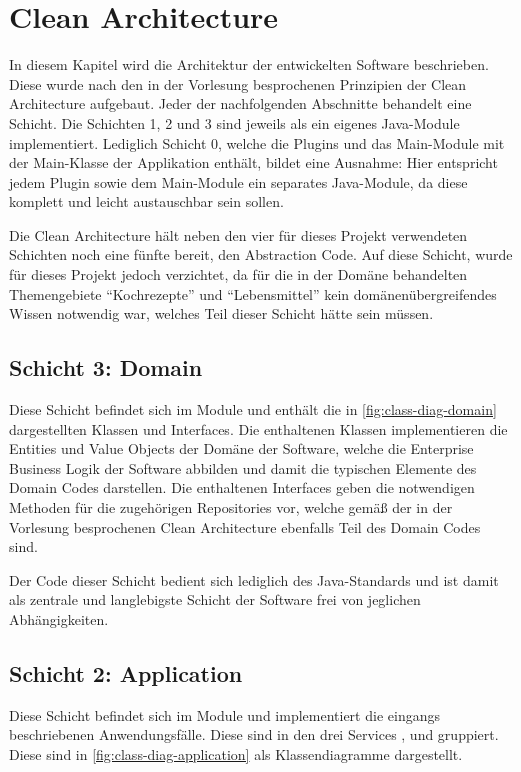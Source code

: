 \chapter{Clean Architecture}
In diesem Kapitel wird die Architektur der entwickelten Software beschrieben. Diese wurde nach den in der Vorlesung besprochenen Prinzipien der Clean Architecture aufgebaut. Jeder der nachfolgenden Abschnitte behandelt eine Schicht. Die Schichten 1, 2 und 3 sind jeweils als ein eigenes Java-Module implementiert. Lediglich Schicht 0, welche die Plugins und das Main-Module mit der Main-Klasse der Applikation enthält, bildet eine Ausnahme: Hier entspricht jedem Plugin sowie dem Main-Module ein separates Java-Module, da diese komplett und leicht austauschbar sein sollen.

Die Clean Architecture hält neben den vier für dieses Projekt verwendeten Schichten noch eine fünfte bereit, den Abstraction Code. Auf diese Schicht, wurde für dieses Projekt jedoch verzichtet, da für die in der Domäne behandelten Themengebiete \enquote{Kochrezepte} und \enquote{Lebensmittel} kein domänenübergreifendes Wissen notwendig war, welches Teil dieser Schicht hätte sein müssen. 

\section{Schicht 3: Domain}
Diese Schicht befindet sich im Module  und enthält die in \autoref{fig:class-diag-domain} dargestellten Klassen und Interfaces. Die enthaltenen Klassen implementieren die Entities und Value Objects der Domäne der Software, welche die Enterprise Business Logik der Software abbilden und damit die typischen Elemente des Domain Codes darstellen. Die enthaltenen Interfaces geben die notwendigen Methoden für die zugehörigen Repositories vor, welche gemäß der in der Vorlesung besprochenen Clean Architecture ebenfalls Teil des Domain Codes sind.

Der Code dieser Schicht bedient sich lediglich des Java-Standards und ist damit als zentrale und langlebigste Schicht der Software frei von jeglichen Abhängigkeiten.

\section{Schicht 2: Application}
Diese Schicht befindet sich im Module  und implementiert die eingangs beschriebenen Anwendungsfälle. Diese sind in den drei Services ,  und  gruppiert. Diese sind in \autoref{fig:class-diag-application} als Klassendiagramme dargestellt.

